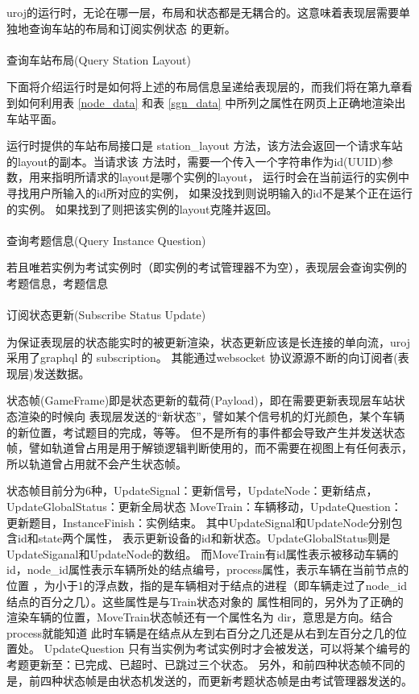 uroj的运行时，无论在哪一层，布局和状态都是无耦合的。这意味着表现层需要单独地查询车站的布局和订阅实例状态
的更新。

\paragraph{}查询车站布局(Query Station Layout)

下面将介绍运行时是如何将上述的布局信息呈递给表现层的，而我们将在第九章看到如何利用表 \ref{node_data}
和表 \ref{sgn_data} 中所列之属性在网页上正确地渲染出车站平面。

运行时提供的车站布局接口是 station\_layout 方法，该方法会返回一个请求车站的layout的副本。当请求该
方法时，需要一个传入一个字符串作为id(UUID)参数，用来指明所请求的layout是哪个实例的layout，
运行时会在当前运行的实例中寻找用户所输入的id所对应的实例，
如果没找到则说明输入的id不是某个正在运行的实例。
如果找到了则把该实例的layout克隆并返回。

\paragraph{}查询考题信息(Query Instance Question)

若且唯若实例为考试实例时（即实例的考试管理器不为空），表现层会查询实例的考题信息，考题信息

\paragraph{}订阅状态更新(Subscribe Status Update)

为保证表现层的状态能实时的被更新渲染，状态更新应该是长连接的单向流，uroj采用了graphql 的 subscription。
其能通过websocket 协议源源不断的向订阅者(表现层)发送数据。

状态帧(GameFrame)即是状态更新的载荷(Payload)，即在需要更新表现层车站状态渲染的时候向
表现层发送的“新状态”，譬如某个信号机的灯光颜色，某个车辆的新位置，考试题目的完成，等等。
但不是所有的事件都会导致产生并发送状态帧，譬如轨道曾占用是用于解锁逻辑判断使用的，而不需要在视图上有任何表示，
所以轨道曾占用就不会产生状态帧。

状态帧目前分为6种，UpdateSignal：更新信号，UpdateNode：更新结点，UpdateGlobalStatus：更新全局状态
MoveTrain：车辆移动，UpdateQuestion：更新题目，InstanceFinish：实例结束。
其中UpdateSignal和UpdateNode分别包含id和state两个属性，
表示更新设备的id和新状态。UpdateGlobalStatus则是UpdateSiganal和UpdateNode的数组。
而MoveTrain有id属性表示被移动车辆的id，node\_id属性表示车辆所处的结点编号，process属性，表示车辆在当前节点的位置
，为小于1的浮点数，指的是车辆相对于结点的进程（即车辆走过了node\_id 结点的百分之几）。这些属性是与Train状态对象的
属性相同的，另外为了正确的渲染车辆的位置，MoveTrain状态帧还有一个属性名为 dir，意思是方向。结合process就能知道
此时车辆是在结点从左到右百分之几还是从右到左百分之几的位置处。
UpdateQuestion 只有当实例为考试实例时才会被发送，可以将某个编号的考题更新至：已完成、已超时、已跳过三个状态。
另外，和前四种状态帧不同的是，前四种状态帧是由状态机发送的，而更新考题状态帧是由考试管理器发送的。

